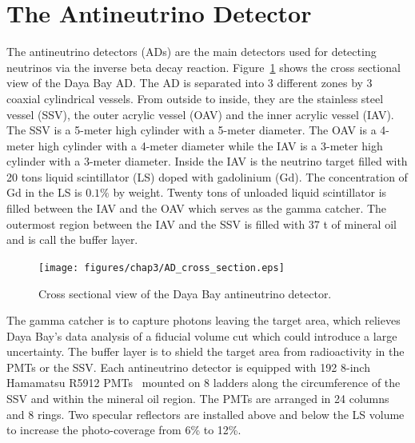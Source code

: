 \section{The Antineutrino Detector}

The antineutrino detectors (ADs) are the main detectors used for detecting neutrinos via the inverse beta decay reaction. Figure~\ref{fig:CSAD} shows the cross sectional view of the Daya Bay AD. The AD is separated into 3 different zones by 3 coaxial cylindrical vessels. From outside to inside, they are the stainless steel vessel (SSV), the outer acrylic vessel (OAV) and the inner acrylic vessel (IAV). The SSV is a 5-meter high cylinder with a 5-meter diameter. The OAV is a 4-meter high cylinder with a 4-meter diameter while the IAV is a 3-meter high cylinder with a 3-meter diameter. Inside the IAV is the neutrino target filled with 20 tons liquid scintillator (LS) doped with gadolinium (Gd). The concentration of Gd in the LS is $0.1\%$ by weight. Twenty tons of unloaded liquid scintillator is filled between the IAV and the OAV which serves as the gamma catcher. The outermost region between the IAV and the SSV is filled with 37 t of mineral oil and is call the buffer layer.
\begin{figure}
	\centering
	\texttt{[image: figures/chap3/AD\_cross\_section.eps]}
	\caption{Cross sectional view of the Daya Bay antineutrino detector.}
	\label{fig:CSAD}
\end{figure}
The gamma catcher is to capture photons leaving the target area, which relieves Daya Bay's data analysis of a fiducial volume cut which could introduce a large uncertainty. The buffer layer is to shield the target area from radioactivity in the PMTs or the SSV.
Each antineutrino detector is equipped with 192 8-inch Hamamatsu R5912 PMTs~\cite{Hamamatsu} mounted on 8 ladders along the circumference of the SSV and within the mineral oil region. The PMTs are arranged in 24 columns and 8 rings. Two specular reflectors are installed above and below the LS volume to increase the photo-coverage from 6\% to 12\%.

